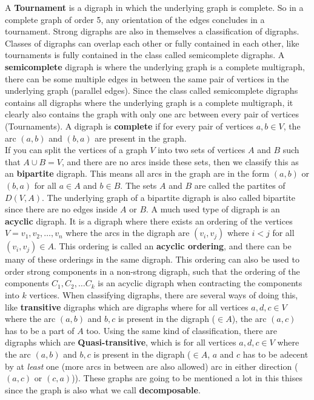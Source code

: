 A \textbf{Tournament} is a digraph in which the underlying graph is complete. 
So in a complete graph of order 5, any orientation of the edges concludes in a tournament.
Strong digraphs are also in themselves a classification of digraphs. 
Classes of digraphs can overlap each other or fully contained in each other, like tournaments is fully contained in the class called semicomplete digraphs.
A \textbf{semicomplete} digraph is where the underlying graph is a complete multigraph, there can be some multiple edges in between the same pair of vertices in the underlying graph (parallel edges). 
Since the class called semicomplete digraphs contains all digraphs where the underlying graph is a complete multigraph, it clearly also contains the graph with only one arc between every pair of vertices (Tournaments).
A digraph is \textbf{complete} if for every pair of vertices $a,b\in V$, the arc $(a,b)$ and $(b,a)$ are present in the graph. \\
If you can split the vertices of a graph $V$ into two sets of vertices $A$ and $B$ such that $A\cup B=V$, and there are no arcs inside these sets, then we classify this as an \textbf{bipartite} digraph. 
This means all arcs in the graph are in the form $(a,b)$ or $(b,a)$ for all $a\in A$ and $b\in B$. 
The sets $A$ and $B$ are called the partites of $D(V,A)$. 
The underlying graph of a bipartite digraph is also called bipartite since there are no edges inside $A$ or $B$.
A much used type of digraph is an \textbf{acyclic} digraph. 
It is a digraph where there exists an ordering of the vertices $V={v_1, v_2,\dots , v_n}$ where the arcs in the digraph are $(v_i, v_j)$ where $i<j$ for all $(v_i, v_j)\in A$. 
This ordering is called an \textbf{acyclic ordering}, and there can be many of these orderings in the same digraph.
This ordering can also be used to order strong components in a non-strong digraph, such that the ordering of the components $C_1,C_2,\dots C_k$ is an acyclic digraph when contracting the components into $k$ vertices. 
When classifying digraphs, there are several ways of doing this, like \textbf{transitive} digraphs which are digraphs where for all vertices $a,d,c\in V$ where the arc $(a,b)$ and $b,c$ is present in the digraph ($\in A$), the arc $(a,c)$ has to be a part of $A$ too. 
Using the same kind of classification, there are digraphs which are \textbf{Quasi-transitive}, which is for all vertices $a,d,c\in V$ where the arc $(a,b)$ and $b,c$ is present in the digraph ($\in A$, $a$ and $c$ has to be adecent by at \textit{least} one (more arcs in between are also allowed) arc in either direction ($(a,c)$ or $(c,a)$)). These graphs are going to be mentioned a lot in this thises since the graph is also what we call \textbf{decomposable}.\\
